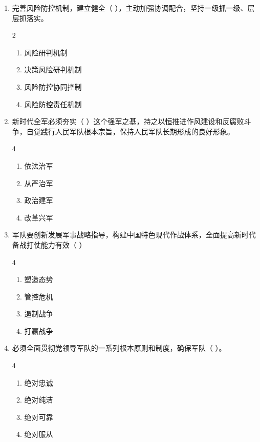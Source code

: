 \documentclass[a4paper,11pt]{ctexart}
\begin{document}
\begin{enumerate}
    \item 完善风险防控机制，建立健全（ ），主动加强协调配合，坚持一级抓一级、层层抓落实。
    \begin{multicols}{2}
    \begin{enumerate}
        \item 风险研判机制
        \item 决策风险研判机制
        \item 风险防控协同控制
        \item 风险防控责任机制
    \end{enumerate}
    \end{multicols}

    \item 新时代全军必须夯实（ ）这个强军之基，持之以恒推进作风建设和反腐败斗争，自觉践行人民军队根本宗旨，保持人民军队长期形成的良好形象。
    \begin{multicols}{4}
    \begin{enumerate}
        \item 依法治军
        \item 从严治军
        \item 政治建军
        \item 改革兴军
    \end{enumerate}
    \end{multicols}

    \item 军队要创新发展军事战略指导，构建中国特色现代作战体系，全面提高新时代备战打仗能力有效（ ）
    \begin{multicols}{4}
    \begin{enumerate}
        \item 塑造态势
        \item 管控危机
        \item 遏制战争
        \item 打赢战争
    \end{enumerate}
    \end{multicols}

    \item 必须全面贯彻党领导军队的一系列根本原则和制度，确保军队（ ）。
    \begin{multicols}{4}
    \begin{enumerate}
        \item 绝对忠诚
        \item 绝对纯洁
        \item 绝对可靠
        \item 绝对服从
    \end{enumerate}
    \end{multicols}


\end{enumerate}
\end{document}
